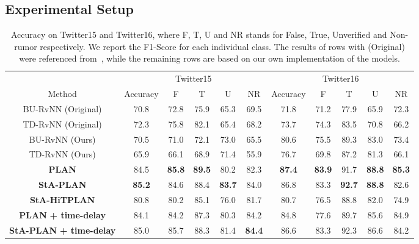\documentclass[letterpaper]{article} %
\begin{document}
\subsection{Experimental Setup}

\begin{table}[ht]
\small
\centering
\begin{tabular}{ccccccccccc} \toprule
& \multicolumn{5}{c}{Twitter15} & \multicolumn{5}{c}{Twitter16} \\
Method		&	Accuracy & F & T & U & NR & Accuracy & F & T & U & NR \\ \midrule
BU-RvNN	(Original) & 70.8 & 72.8 & 75.9 & 65.3 & 69.5
& 71.8 & 71.2 & 77.9 & 65.9 & 72.3\\
TD-RvNN (Original) & 72.3 & 75.8 & 82.1 & 65.4 & 68.2 
& 73.7 & 74.3 & 83.5 & 70.8 & 66.2 \\
BU-RvNN (Ours)	& 70.5 & 71.0 & 72.1 & 73.0 & 65.5 
& 80.6 & 75.5 & 89.3 & 83.0 & 73.4\\
TD-RvNN	(Ours) & 65.9 & 66.1 & 68.9 & 71.4 & 55.9 
& 76.7 & 69.8 & 87.2 & 81.3 & 66.1 \\
\midrule
\textbf{PLAN}	& 84.5 & \textbf{85.8} & \textbf{89.5} & 80.2 & 82.3 
 & \textbf{87.4} & \textbf{83.9} & 91.7 & \textbf{88.8} & \textbf{85.3} \\
\textbf{StA-PLAN} & \textbf{85.2} & 84.6 & 88.4 & \textbf{83.7} & 84.0
& 86.8 & 83.3 & \textbf{92.7} & \textbf{88.8} & 82.6\\
\textbf{StA-HiTPLAN} & 80.8 & 80.2 & 85.1 & 76.0 & 81.7 
& 80.7 & 76.5 & 88.8 & 82.0 & 74.9 \\
\textbf{PLAN} \textbf{+ time-delay}	& 84.1 & 84.2 & 87.3 & 80.3 & 84.2
& 84.8 & 77.6 & 89.7 & 85.6 & 84.9\\
\textbf{StA-PLAN} \textbf{+ time-delay} & 85.0 & 85.7 & 88.3 & 81.4 & \textbf{84.4}
 & 86.6 & 83.3 & 92.3 & 86.6 & 84.2 \\
\bottomrule 
\end{tabular}
\caption{Accuracy on Twitter15 and Twitter16, where F, T, U and NR stands for False, True, Unverified and Non-rumor respectively. We report the F1-Score for each individual class. The results of rows with (Original) were referenced from~\cite{ma17}, while the remaining rows are based on our own implementation of the models.} 
\label{tab:results_15}
\end{table}
\end{document}
